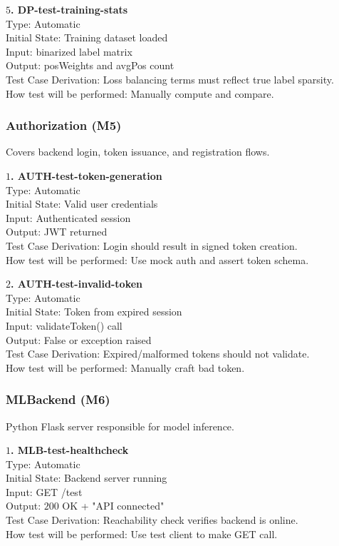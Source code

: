 \documentclass[12pt, titlepage]{article}
\begin{document}
\textbf{$5$. DP-test-training-stats}\\
Type: Automatic\\
Initial State: Training dataset loaded\\
Input: binarized label matrix\\
Output: posWeights and avgPos count\\
Test Case Derivation: Loss balancing terms must reflect true label sparsity.\\
How test will be performed: Manually compute and compare.

\subsubsection{Authorization (M5)}
Covers backend login, token issuance, and registration flows.

\textbf{$1$. AUTH-test-token-generation}\\
Type: Automatic\\
Initial State: Valid user credentials\\
Input: Authenticated session\\
Output: JWT returned\\
Test Case Derivation: Login should result in signed token creation.\\
How test will be performed: Use mock auth and assert token schema.

\textbf{$2$. AUTH-test-invalid-token}\\
Type: Automatic\\
Initial State: Token from expired session\\
Input: validateToken() call\\
Output: False or exception raised\\
Test Case Derivation: Expired/malformed tokens should not validate.\\
How test will be performed: Manually craft bad token.

\subsubsection{MLBackend (M6)}
Python Flask server responsible for model inference.

\textbf{$1$. MLB-test-healthcheck}\\
Type: Automatic\\
Initial State: Backend server running\\
Input: GET /test\\
Output: $200$ OK + "API connected"\\
Test Case Derivation: Reachability check verifies backend is online.\\
How test will be performed: Use test client to make GET call.
\end{document}

